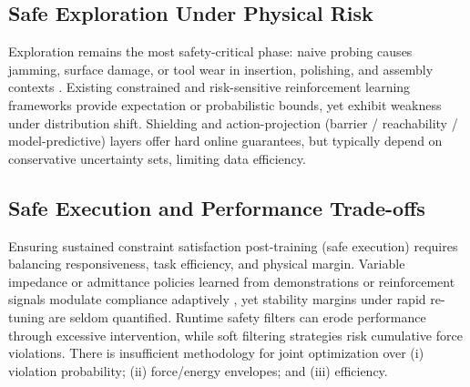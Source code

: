 \documentclass[Afour,sageh,times]{template/sagej}
\begin{document}
    
    \subsection{Safe Exploration Under Physical Risk}
    Exploration remains the most safety-critical phase: naive probing causes jamming, surface damage, or tool wear in insertion, polishing, and assembly contexts \citep{yuan2022safe,zhang2024srl}. Existing constrained and risk-sensitive reinforcement learning frameworks provide expectation or probabilistic bounds, yet exhibit weakness under distribution shift. Shielding and action-projection (barrier / reachability / model-predictive) layers offer hard online guarantees, but typically depend on conservative uncertainty sets, limiting data efficiency.
    
    \subsection{Safe Execution and Performance Trade-offs}
    Ensuring sustained constraint satisfaction post-training (safe execution) requires balancing responsiveness, task efficiency, and physical margin. Variable impedance or admittance policies learned from demonstrations or reinforcement signals modulate compliance adaptively \citep{28,25,zhang2024srl}, yet stability margins under rapid re-tuning are seldom quantified. 
    Runtime safety filters can erode performance through excessive intervention, while soft filtering strategies risk cumulative force violations. There is insufficient methodology for joint optimization over (i) violation probability; (ii) force/energy envelopes; and (iii) efficiency.
    
\end{document}
